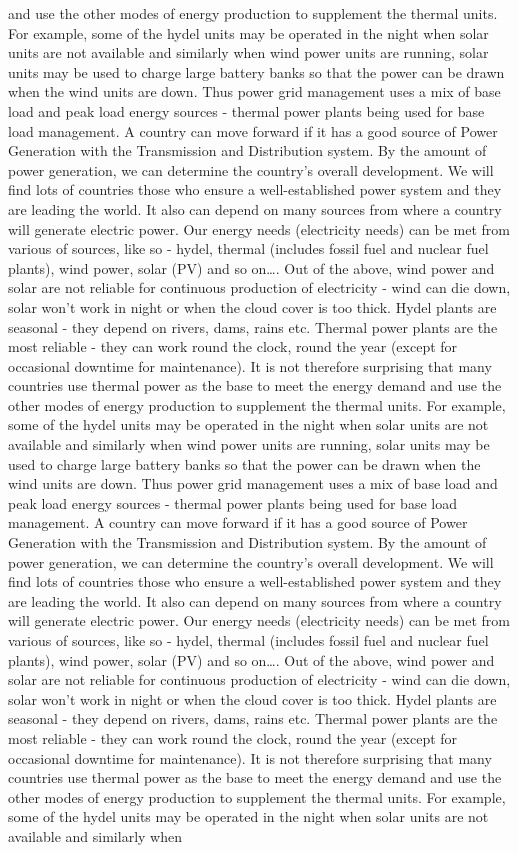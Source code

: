 \documentclass[10pt, a4paper]{article}
\begin{document}
and use the other modes of energy production to supplement the thermal units. For example, some of the hydel units may be operated in the night when solar units are not available and similarly when wind power units are running, solar units may be used to charge large battery banks so that the power can be drawn when the wind units are down. Thus power grid management uses a mix of base load and peak load energy sources - thermal power plants being used for base load management. A country can move forward if it has a good source of Power Generation with the Transmission and Distribution system. By the amount of power generation, we can determine the country’s overall development. We will find lots of countries those who ensure a well-established power system and they are leading the world. It also can depend on many sources from where a country will generate electric power. Our energy needs (electricity needs) can be met from various of sources, like so - hydel, thermal (includes fossil fuel and nuclear fuel plants), wind power, solar (PV) and so on\dots. Out of the above, wind power and solar are not reliable for continuous production of electricity - wind can die down, solar won’t work in night or when the cloud cover is too thick. Hydel plants are seasonal - they depend on rivers, dams, rains etc. Thermal power plants are the most reliable - they can work round the clock, round the year (except for occasional downtime for maintenance). It is not therefore surprising that many countries use thermal power as the base to meet the energy demand and use the other modes of energy production to supplement the thermal units. For example, some of the hydel units may be operated in the night when solar units are not available and similarly when wind power units are running, solar units may be used to charge large battery banks so that the power can be drawn when the wind units are down. Thus power grid management uses a mix of base load and peak load energy sources - thermal power plants being used for base load management. A country can move forward if it has a good source of Power Generation with the Transmission and Distribution system. By the amount of power generation, we can determine the country’s overall development. We will find lots of countries those who ensure a well-established power system and they are leading the world. It also can depend on many sources from where a country will generate electric power. Our energy needs (electricity needs) can be met from various of sources, like so - hydel, thermal (includes fossil fuel and nuclear fuel plants), wind power, solar (PV) and so on\dots. Out of the above, wind power and solar are not reliable for continuous production of electricity - wind can die down, solar won’t work in night or when the cloud cover is too thick. Hydel plants are seasonal - they depend on rivers, dams, rains etc. Thermal power plants are the most reliable - they can work round the clock, round the year (except for occasional downtime for maintenance). It is not therefore surprising that many countries use thermal power as the base to meet the energy demand and use the other modes of energy production to supplement the thermal units. For example, some of the hydel units may be operated in the night when solar units are not available and similarly when 
\end{document}
